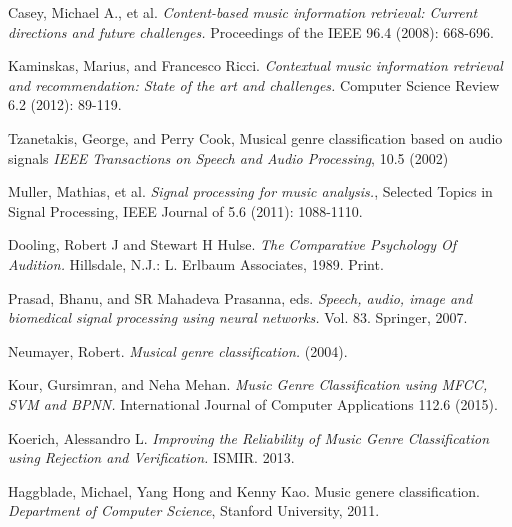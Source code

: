 \begin{thebibliography}{9}
                Casey, Michael A., et al. 
                \emph{Content-based music information retrieval: Current directions and future challenges.} 
                Proceedings of the IEEE 96.4 (2008): 668-696.

                Kaminskas, Marius, and Francesco Ricci.
                \emph{Contextual music information retrieval and recommendation: State of the art and challenges.} 
                Computer Science Review 6.2 (2012): 89-119.

                Tzanetakis, George, and Perry Cook, Musical genre classification based on audio signals
                \emph{IEEE Transactions on Speech and Audio Processing},
                10.5 (2002)

                Muller, Mathias, et al. 
                \emph{Signal processing for music analysis.}, 
                Selected Topics in Signal Processing, IEEE Journal of 5.6 (2011): 1088-1110.

                Dooling, Robert J and Stewart H Hulse. 
                \emph{The Comparative Psychology Of Audition.} 
                Hillsdale, N.J.: L. Erlbaum Associates, 1989. Print.

                Prasad, Bhanu, and SR Mahadeva Prasanna, eds. 
                \emph{Speech, audio, image and biomedical signal processing using neural networks.} 
                Vol. 83. Springer, 2007.

                Neumayer, Robert. 
                \emph{Musical genre classification.} 
                (2004).

                Kour, Gursimran, and Neha Mehan. 
                \emph{Music Genre Classification using MFCC, SVM and BPNN.} 
                International Journal of Computer Applications 112.6 (2015).

                Koerich, Alessandro L. 
                \emph{Improving the Reliability of Music Genre Classification using Rejection and Verification.} 
                ISMIR. 2013.

                Haggblade, Michael, Yang Hong and Kenny Kao. Music genere classification.
                \emph{Department of Computer Science},
                Stanford University,
                2011.


\end{thebibliography}
